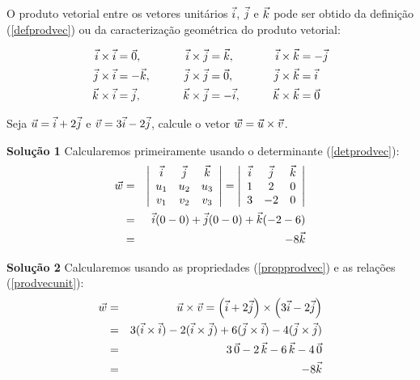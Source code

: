 O produto vetorial entre os vetores unitários $\vec{i}$, $\vec{j}$ e $\vec{k}$ pode ser obtido da definição (\ref{defprodvec}) ou da caracterização geométrica do produto vetorial:

\begin{align}\label{prodvecunit}
\vec{i}\times \vec{i}&=\vec{0},\qquad & \vec{i}\times \vec{j}&=\vec{k},\qquad &\vec{i}\times \vec{k}&=-\vec{j}\nonumber\\
\vec{j}\times \vec{i}&=-\vec{k},\qquad & \vec{j}\times \vec{j}&=\vec{0},\qquad& \vec{j}\times \vec{k}&=\vec{i}\nonumber\\
\vec{k}\times \vec{i}&=\vec{j},\qquad &\vec{k}\times \vec{j}&=-\vec{i},\qquad &\vec{k}\times \vec{k}&=\vec{0}
\end{align}

\begin{prob} Seja $\vec{u}=\vec{i}+2\vec{j}$ e $\vec{v}=3\vec{i}-2\vec{j}$, calcule o vetor $\vec{w}=\vec{u}\times\vec{v}$.
\end{prob}
{\bf Solução 1} Calcularemos primeiramente usando o determinante (\ref{detprodvec}):
\begin{eqnarray*}\vec{w}&=&\left|\begin{array}{ccc}
\vec{i}&\vec{j}&\vec{k}\\
u_1 & u_2 & u_3\\
v_1 & v_2 & v_3\\
\end{array}
\right|=\left|\begin{array}{ccc}
\vec{i}&\vec{j}&\vec{k}\\
1 & 2 & 0\\
3 & -2& 0\\
\end{array} \right|\\
&=&\vec{i}(0-0)+\vec{j}(0-0)+\vec{k}(-2-6)\\
&=&-8\vec{k}
\end{eqnarray*}

{\bf Solução 2} Calcularemos usando as propriedades (\ref{propprodvec}) e as relações (\ref{prodvecunit}):
\begin{eqnarray*}\vec{w}&=&\vec{u}\times\vec{v}= \left(\vec{i}+2\vec{j}\right)\times\left(3\vec{i}-2\vec{j}\right)\\
&=&3(\vec{i}\times\vec{i})-2(\vec{i}\times\vec{j})+6(\vec{j}\times\vec{i})-4(\vec{j}\times\vec{j})\\
&=&3~\!\vec{0}-2~\!\vec{k}-6~\!\vec{k}-4~\!\vec{0}\\
&=&-8\vec{k}
\end{eqnarray*}


